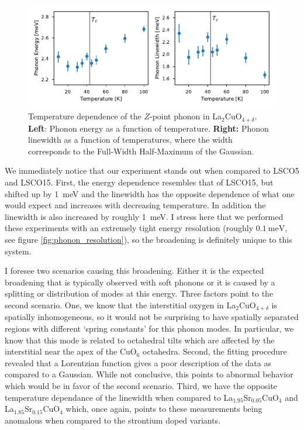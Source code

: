 \begin{figure}
    \centering
    \includegraphics[width=\textwidth]{fig/lowen/lcoo_phonon_energies.pdf}
    \caption[lco+o Z-point phonon E-T plot]{Temperature dependence of the $Z$-point phonon in La$_2$CuO$_{4+\delta}$. \textbf{Left}: Phonon energy as a function of temperature. \textbf{Right:} Phonon linewidth as a function of temperatures, where the width corresponds to the Full-Width Half-Maximum of the Gaussian.}
    \label{fig:lcoo_zpoint_phonon_energies}
\end{figure}

We immediately notice that our experiment stands out when compared to LSCO5 and LSCO15. First, the energy dependence resembles that of LSCO15, but shifted up by \SI{1}{\milli\eV} and the linewidth has the opposite dependence of what one would expect and increases with decreasing temperature. In addition the linewidth is also increased by roughly \SI{1}{\milli\eV}. I stress here that we performed these experiments with an extremely tight energy resolution (roughly $\SI{0.1}{\milli\eV}$, see figure \ref{fig:phonon_resolution}), so the broadening is definitely unique to this system.

I foresee two scenarios causing this broadening. Either it is the expected broadening that is typically observed with soft phonons or it is caused by a splitting or distribution of modes at this energy. Three factors point to the second scenario. One, we know that the interstitial oxygen in La$_2$CuO$_{4+\delta}$ is spatially inhomogeneous, so it would not be surprising to have spatially separated regions with different `spring constants' for this phonon modes. In particular, we know that this mode is related to octahedral tilts which are affected by the interstitial near the apex of the CuO$_6$ octahedra. Second, the fitting procedure revealed that a Lorentzian function gives a poor description of the data as compared to a Gaussian. While not conclusive, this points to abnormal behavior which would be in favor of the second scenario. Third, we have the opposite temperature dependance of the linewidth when compared to La$_{1.95}$Sr$_{0.05}$CuO$_4$ and La$_{1.85}$Sr$_{0.15}$CuO$_4$ which, once again, points to these measurements being anomalous when compared to the strontium doped variants.

